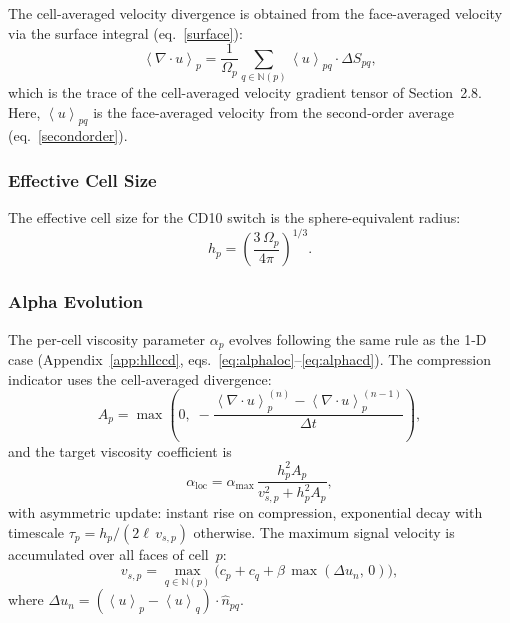 \documentclass[twocolumn]{aastex63}
\newcommand{\vel}{{u}}
\newcommand{\surf}[0]{S}
\begin{document}
The cell-averaged velocity divergence is obtained from
the face-averaged velocity via the surface integral
(eq.~\ref{surface}):
\begin{equation}\label{eq:divv3d}
  \left<\nabla\cdot\vel\right>_p
  = \frac{1}{\Omega_p}
    \sum_{q\in\mathbb{N}(p)}
      \left<\vel\right>_{pq} \cdot \Delta\surf_{pq},
\end{equation}
which is the trace of the cell-averaged velocity gradient
tensor of Section~2.8.
Here, $\left<\vel\right>_{pq}$ is the face-averaged velocity
from the second-order average
(eq.~\ref{secondorder}).

\subsubsection{Effective Cell Size}

The effective cell size for the CD10 switch is
the sphere-equivalent radius:
\begin{equation}
  h_p = \left(\frac{3\,\Omega_p}{4\pi}\right)^{1/3}.
\end{equation}

\subsubsection{Alpha Evolution}

The per-cell viscosity parameter $\alpha_p$ evolves
following the same rule as the 1-D case
(Appendix~\ref{app:hllccd},
eqs.~\ref{eq:alphaloc}--\ref{eq:alphacd}).
The compression indicator uses the cell-averaged divergence:
\begin{equation}
  A_p = \max\!\left(0,\;
    -\frac{\left<\nabla\!\cdot\!\vel\right>_p^{(n)}
         - \left<\nabla\!\cdot\!\vel\right>_p^{(n-1)}}
          {\Delta t}\right),
\end{equation}
and the target viscosity coefficient is
\begin{equation}
  \alpha_\mathrm{loc}
  = \alpha_\mathrm{max}\,
    \frac{h_p^2 A_p}{v_{s,p}^2 + h_p^2 A_p},
\end{equation}
with asymmetric update:
instant rise on compression,
exponential decay with timescale
$\tau_p = h_p / (2\ell\,v_{s,p})$ otherwise.
The maximum signal velocity is accumulated over all
faces of cell~$p$:
\begin{equation}
  v_{s,p} = \max_{q\in\mathbb{N}(p)}
    \bigl(c_p + c_q + \beta\,\max(\Delta\vel_n,\,0)\bigr),
\end{equation}
where $\Delta\vel_n = (\left<\vel\right>_p - \left<\vel\right>_q)
  \cdot\hat{n}_{pq}$.
\end{document}
